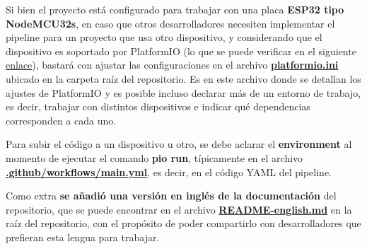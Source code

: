 Si bien el proyecto está configurado para trabajar con una placa \textbf{ESP32 tipo NodeMCU32s}, en caso que otros desarrolladores necesiten implementar el pipeline para un proyecto que usa otro dispositivo, y considerando que el dispositivo es soportado por PlatformIO (lo que se puede verificar en el siguiente \href{https://registry.platformio.org/search?t=platform}{enlace}), bastará con ajustar las configuraciones en el archivo \href{https://github.com/FeedehC/pipeline-esp32/blob/main/platformio.ini}{\textbf{platformio.ini}} ubicado en la carpeta raíz del repositorio. Es en este archivo donde se detallan los ajustes de PlatformIO y es posible incluso declarar más de un entorno de trabajo, es decir, trabajar con distintos dispositivos e indicar qué dependencias corresponden a cada uno. 

Para subir el código a un dispositivo u otro, se debe aclarar el \textbf{environment} al momento de ejecutar el comando \textbf{pio run}, típicamente en el archivo \href{https://github.com/FeedehC/pipeline-esp32/blob/main/.github/workflows/main.yml}{\textbf{.github/workflows/main.yml}}, es decir, en el código YAML del pipeline.

Como extra \textbf{se añadió una versión en inglés de la documentación} del repositorio, que se puede encontrar en el archivo \href{https://github.com/FeedehC/pipeline-esp32/blob/main/README-english.md}{\textbf{README-english.md}} en la raíz del repositorio, con el propósito de poder compartirlo con desarrolladores que prefieran esta lengua para trabajar.

